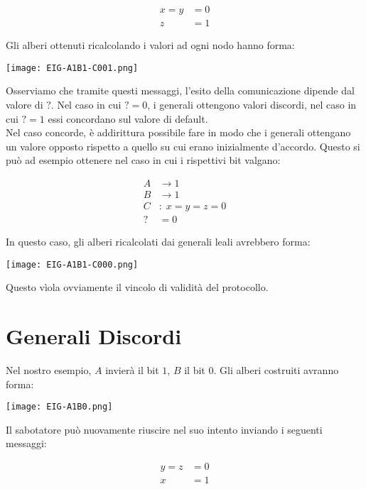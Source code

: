 \documentclass{article}
\begin{document}
\begin{align*}
    x = y &= 0\\
    z &= 1
\end{align*}

Gli alberi ottenuti ricalcolando i valori ad ogni nodo hanno forma:

\begin{center}
    \texttt{[image: EIG-A1B1-C001.png]}
\end{center}

Osserviamo che tramite questi messaggi, l'esito della comunicazione dipende dal valore di $?$. Nel caso in cui $? = 0$, i generali ottengono valori discordi, nel caso in cui $? = 1$ essi concordano sul valore di default.\\

Nel caso concorde, è addirittura possibile fare in modo che i generali ottengano un valore opposto rispetto a quello su cui erano inizialmente d'accordo. 
Questo si può ad esempio ottenere nel caso in cui i rispettivi bit valgano:

\begin{align*}
    A&\to 1 \\
    B&\to 1 \\
    C&: \; x = y = z = 0\\
    ?& = 0
\end{align*}

In questo caso, gli alberi ricalcolati dai generali leali avrebbero forma:

\begin{center}
    \texttt{[image: EIG-A1B1-C000.png]}
\end{center}

Questo vìola ovviamente il vincolo di validità del protocollo.

\section{Generali Discordi}

Nel nostro esempio, $A$ invierà il bit $1$, $B$ il bit $0$. Gli alberi costruiti avranno forma:

\begin{center}
    \texttt{[image: EIG-A1B0.png]}
\end{center}

Il sabotatore può nuovamente riuscire nel suo intento inviando i seguenti messaggi:

\begin{align*}
    y = z &= 0\\
    x &= 1
\end{align*}
\end{document}
